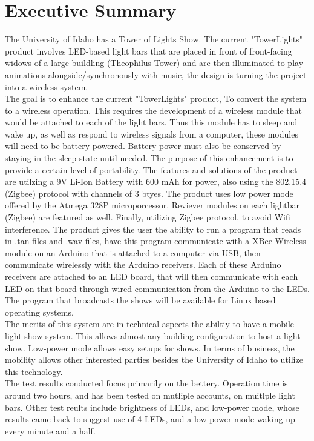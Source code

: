 \documentclass[12pt]{article}
\begin{document}
	\tableofcontents
	\newpage
	
	
		\section{Executive Summary}
		The University of Idaho has a Tower of Lights Show. The current "TowerLights" product involves LED-based light bars that are placed in front of front-facing widows of a large buildling (Theophilus Tower) and are then illuminated to play animations alongside/synchronously with music, the design is turning the project into a wireless system.\\
		The goal is to enhance the current "TowerLights" product, To convert the system to a wireless operation. This requires the development of a wireless module that would be attached to each of the light bars. Thus this module has to sleep and wake up, as well as respond to wireless signals from a computer, these modules will need to be battery powered. Battery power must also be conserved by staying in the sleep state until needed. The purpose of this enhancement is to provide a certain level of portability. The features and solutions of the product are utilzing a 9V Li-Ion Battery with 600 mAh for power, also using the 802.15.4 (Zigbee) protocol with channels of 3 btyes. The product uses low power mode offered by the Atmega 328P microporcessor. Reviever modules on each lightbar (Zigbee) are featured as well. Finally, utilizing Zigbee protocol, to avoid Wifi interference. The product gives the user the ability to run a program that reads in .tan files and .wav files, have this program communicate with a XBee Wireless module on an Arduino that is attached to a computer via USB, then communicate wirelessly with the Arduino receivers. Each of these Arduino receivers are attached to an LED board, that will then communicate with each LED on that board through wired communication from the Arduino to the LEDs. The program that broadcasts the shows will be available for Linux based operating systems.\\
		The merits of this system are in technical aspects the abiltiy to have a mobile light show system. This allows almost any building configuration to host a light show. Low-power mode allows easy setups for shows. In terms of business, the mobility allows other interested parties besides the University of Idaho to utilize this technology.\\
		The test results conducted focus primarily on the bettery. Operation time is around two hours, and has been tested on mutliple accounts, on muitlple light bars. Other test reults include brightness of LEDs, and low-power mode, whose results came back to suggest use of 4 LEDs, and a low-power mode waking up every minute and a half. 
		
\end{document}
